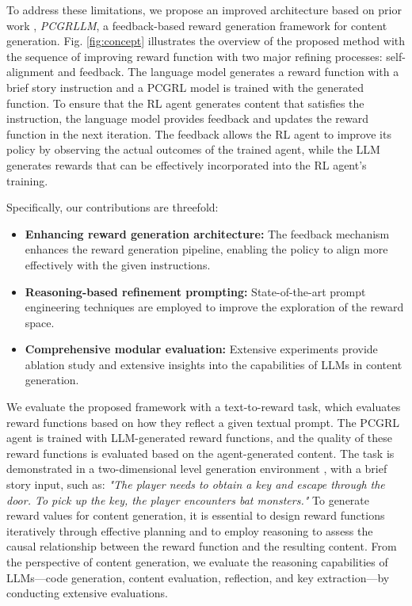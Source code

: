 To address these limitations, we propose an improved architecture based on prior work \cite{baek2024chatpcg}, \textit{PCGRLLM}, a feedback-based reward generation framework for content generation.
Fig. \ref{fig:concept} illustrates the overview of the proposed method with the sequence of improving reward function with two major refining processes: self-alignment and feedback.
The language model generates a reward function with a brief story instruction and a PCGRL model is trained with the generated function.
To ensure that the RL agent generates content that satisfies the instruction, the language model provides feedback and updates the reward function in the next iteration.
The feedback allows the RL agent to improve its policy by observing the actual outcomes of the trained agent, while the LLM generates rewards that can be effectively incorporated into the RL agent's training.

Specifically, our contributions are threefold:
\begin{itemize}
\item \textbf{Enhancing reward generation architecture:} The feedback mechanism enhances the reward generation pipeline, enabling the policy to align more effectively with the given instructions.
\item \textbf{Reasoning-based refinement prompting:} State-of-the-art prompt engineering techniques are employed to improve the exploration of the reward space.
\item \textbf{Comprehensive modular evaluation:} Extensive experiments provide ablation study and extensive insights into the capabilities of LLMs in content generation.
\end{itemize}

We evaluate the proposed framework with a text-to-reward task, which evaluates reward functions based on how they reflect a given textual prompt.
The PCGRL agent is trained with LLM-generated reward functions, and the quality of these reward functions is evaluated based on the agent-generated content.
The task is demonstrated in a two-dimensional level generation environment \cite{khalifa2020pcgrl,earle2024scaling}, with a brief story input, such as: \textit{"The player needs to obtain a key and escape through the door. To pick up the key, the player encounters bat monsters."}
To generate reward values for content generation, it is essential to design reward functions iteratively through effective planning and to employ reasoning to assess the causal relationship between the reward function and the resulting content.
From the perspective of content generation, we evaluate the reasoning capabilities of LLMs---code  generation, content evaluation, reflection, and key extraction---by conducting extensive evaluations.
